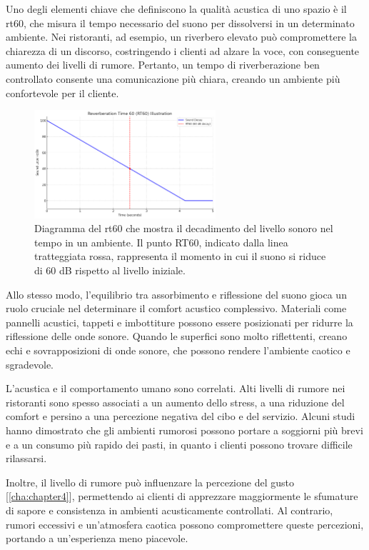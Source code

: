 Uno degli elementi chiave che definiscono la qualità acustica di uno spazio è il \gls{rt60}, che misura il tempo necessario del suono per dissolversi in un determinato ambiente. Nei ristoranti, ad esempio, un riverbero elevato può compromettere la chiarezza di un discorso, costringendo i clienti ad alzare la voce, con conseguente aumento dei livelli di rumore. Pertanto, un tempo di riverberazione ben controllato consente una comunicazione più chiara, creando un ambiente più confortevole per il cliente.

\begin{figure}[H]
      \centering
      \includegraphics[width=0.6\textwidth]{Chapters/Figures/RT60.png}
      \caption{\small Diagramma del \gls{rt60} che mostra il decadimento del livello sonoro nel tempo in un ambiente. Il punto RT60, indicato dalla linea tratteggiata rossa, rappresenta il momento in cui il suono si riduce di 60 dB rispetto al livello iniziale.}
      \label{fig:RT60}
\end{figure}

Allo stesso modo, l'equilibrio tra assorbimento e riflessione del suono gioca un ruolo cruciale nel determinare il comfort acustico complessivo. Materiali come pannelli acustici, tappeti e imbottiture possono essere posizionati per ridurre la riflessione delle onde sonore. Quando le superfici sono molto riflettenti, creano echi e sovrapposizioni di onde sonore, che possono rendere l'ambiente caotico e sgradevole.

L'acustica e il comportamento umano sono correlati. Alti livelli di rumore nei ristoranti sono spesso associati a un aumento dello stress, a una riduzione del comfort e persino a una percezione negativa del cibo e del servizio. Alcuni studi hanno dimostrato che gli ambienti rumorosi possono portare a soggiorni più brevi e a un consumo più rapido dei pasti, in quanto i clienti possono trovare difficile rilassarsi. \cite{gbacoustics2023}

Inoltre, il livello di rumore può influenzare la percezione del gusto [\ref{cha:chapter4}], permettendo ai clienti di apprezzare maggiormente le sfumature di sapore e consistenza in ambienti acusticamente controllati. Al contrario, rumori eccessivi e un’atmosfera caotica possono compromettere queste percezioni, portando a un’esperienza meno piacevole.

